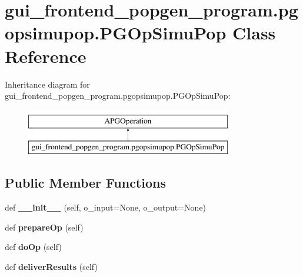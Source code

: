 \hypertarget{classgui__frontend__popgen__program_1_1pgopsimupop_1_1PGOpSimuPop}{}\section{gui\+\_\+frontend\+\_\+popgen\+\_\+program.\+pgopsimupop.\+P\+G\+Op\+Simu\+Pop Class Reference}
\label{classgui__frontend__popgen__program_1_1pgopsimupop_1_1PGOpSimuPop}
Inheritance diagram for gui\+\_\+frontend\+\_\+popgen\+\_\+program.\+pgopsimupop.\+P\+G\+Op\+Simu\+Pop\+:\begin{figure}[H]
\begin{center}
\leavevmode
\includegraphics[height=2.000000cm]{classgui__frontend__popgen__program_1_1pgopsimupop_1_1PGOpSimuPop}
\end{center}
\end{figure}
\subsection*{Public Member Functions}
\begin{DoxyCompactItemize}
\item 
def {\bfseries \+\_\+\+\_\+init\+\_\+\+\_\+} (self, o\+\_\+input=None, o\+\_\+output=None)\hypertarget{classgui__frontend__popgen__program_1_1pgopsimupop_1_1PGOpSimuPop_a531e6d5be4c802ded5589b13ea608bfa}{}\label{classgui__frontend__popgen__program_1_1pgopsimupop_1_1PGOpSimuPop_a531e6d5be4c802ded5589b13ea608bfa}

\item 
def {\bfseries prepare\+Op} (self)\hypertarget{classgui__frontend__popgen__program_1_1pgopsimupop_1_1PGOpSimuPop_aef856baf7931e68c08afc1a5b193ef57}{}\label{classgui__frontend__popgen__program_1_1pgopsimupop_1_1PGOpSimuPop_aef856baf7931e68c08afc1a5b193ef57}

\item 
def {\bfseries do\+Op} (self)\hypertarget{classgui__frontend__popgen__program_1_1pgopsimupop_1_1PGOpSimuPop_a4a780914302b14c112b122279084678c}{}\label{classgui__frontend__popgen__program_1_1pgopsimupop_1_1PGOpSimuPop_a4a780914302b14c112b122279084678c}

\item 
def {\bfseries deliver\+Results} (self)\hypertarget{classgui__frontend__popgen__program_1_1pgopsimupop_1_1PGOpSimuPop_aec833df77985af0767c8a39c2c58f411}{}\label{classgui__frontend__popgen__program_1_1pgopsimupop_1_1PGOpSimuPop_aec833df77985af0767c8a39c2c58f411}

\end{DoxyCompactItemize}


